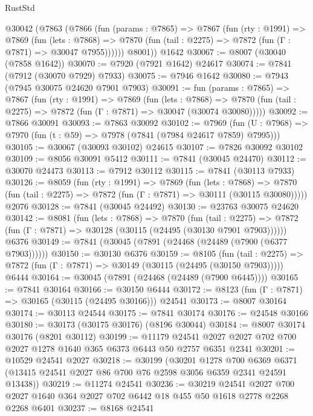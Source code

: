 \begin{lexlean}{RustStd}
\begin{coremodule}
    @30042
      (@7863
        (@7866
          (fun (params : @7865) =>
          @7867
            (fun (rty : @1991) =>
            @7869
              (fun (lets : @7868) =>
              @7870 (fun (tail : @2275) => @7872 (fun (Γ : @7871) => @30047 @7955))))))
        @8001))
    @1642
@30067 := @8007 (@30040 (@7858 @1642))
@30070 := @7920 (@7921 @1642) @24617
@30074 := @7841 (@7912 (@30070 @7929) @7933)
@30075 := @7946 @1642
@30080 := @7943 (@7945 @30075 @24620 @7901 @7903)
@30091 := fun (params : @7865) =>
  @7867
    (fun (rty : @1991) =>
    @7869
      (fun (lets : @7868) =>
      @7870 (fun (tail : @2275) => @7872 (fun (Γ : @7871) => @30047 (@30074 @30080)))))
@30092 := @7866 @30091
@30093 := @7863 @30092
@30102 := @7969
    (fun (U : @7968) => @7970 (fun (t : @59) => @7978 (@7841 (@7984 @24617 @7859) @7995)))
@30105 := @30067 (@30093 @30102) @24615
@30107 := @7826 @30092 @30102
@30109 := @8056 @30091 @5412
@30111 := @7841 (@30045 @24470)
@30112 := @30070 @24473
@30113 := @7912 @30112
@30115 := @7841 (@30113 @7933)
@30126 := @8059
    (fun (rty : @1991) =>
    @7869
      (fun (lets : @7868) =>
      @7870 (fun (tail : @2275) => @7872 (fun (Γ : @7871) => @30111 (@30115 @30080)))))
    @2076
@30128 := @7841 (@30045 @24492)
@30130 := @23763 @30075 @24620
@30142 := @8081
    (fun (lets : @7868) =>
    @7870
      (fun (tail : @2275) =>
      @7872 (fun (Γ : @7871) => @30128 (@30115 (@24495 (@30130 @7901 @7903))))))
    @6376
@30149 := @7841 (@30045 (@7891 (@24468 (@24489 (@7900 (@6377 @7903))))))
@30150 := @30130 @6376
@30159 := @8105
    (fun (tail : @2275) => @7872 (fun (Γ : @7871) => @30149 (@30115 (@24495 (@30150 @7903)))))
    @6444
@30164 := @30045 (@7891 (@24468 (@24489 (@7900 @6445))))
@30165 := @7841 @30164
@30166 := @30150 @6444
@30172 := @8123 (fun (Γ : @7871) => @30165 (@30115 (@24495 @30166))) @24541
@30173 := @8007 @30164
@30174 := @30113 @24544
@30175 := @7841 @30174
@30176 := @24548 @30166
@30180 := @30173 (@30175 @30176) (@8196 @30044)
@30184 := @8007 @30174 @30176 (@8201 @30112)
@30199 := @11179
    @24541
    @2027
    @2027
    @702
    @700
    @2027
    @1278
    @1640
    @365
    @6373
    @6443
    @50
    @2757
    @6351
    @2341
@30201 := @10529 @24541 @2027
@30218 := @30199
    (@30201
      @1278
      @700
      @6369
      @6371
      (@13415 @24541 @2027 @86 @700 @76 @2598 @3056 @6359 @2341 @24591 @13438))
@30219 := @11274 @24541
@30236 := @30219
    @24541
    @2027
    @700
    @2027
    @1640
    @364
    @2027
    @702
    @6442
    @18
    @455
    @50
    @1618
    @2778
    @2268
    @2268
    @6401
@30237 := @8168 @24541

\end{coremodule}
\end{lexlean}
